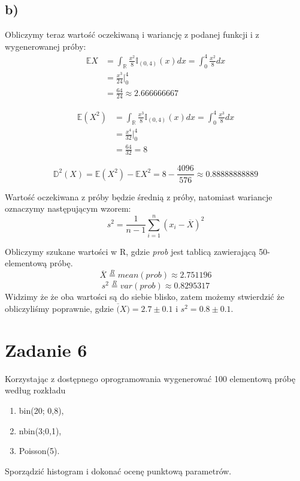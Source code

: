 \documentclass{article}
\begin{document}
\subsection{b)}
Obliczymy teraz wartość oczekiwaną i wariancję z podanej funkcji i z wygenerowanej próby:
\begin{align*}
\mathbb{E}X & = \int_\mathbb{R} \frac{x^2}{8}\mathbb{I}_{(0,4)}(x) dx = \int_0^4 \frac{x^2}{8} dx \\
& = \frac{x^3}{24} \Big\vert_0^4 \\
& = \frac{64}{24} \approx 2.666666667
\end{align*}

\begin{align*}
\mathbb{E}(X^2) & = \int_\mathbb{R} \frac{x^3}{8}\mathbb{I}_{(0,4)}(x) dx = \int_0^4 \frac{x^3}{8} dx \\
& = \frac{x^4}{32} \Big\vert_0^4 \\
& = \frac{64}{32} = 8
\end{align*}

\[ \mathbb{D}^2(X) = \mathbb{E}(X^2) - \mathbb{E}X^2 = 8 - \frac{4096}{576} \approx 0.88888888889 \]

Wartość oczekiwana z próby będzie średnią z próby, natomiast wariancje oznaczymy następującym wzorem:
\[ s^2 = \frac{1}{n-1}\sum_{i=1}^n (x_i - \overline{X})^2 \]

Obliczymy szukane wartości w R, gdzie \textit{prob} jest tablicą zawierającą 50-elementową próbę.
\[ \overline{X} \overset{R}{=} mean(prob) \approx 2.751196 \]
\[ s^2 \overset{R}{=} var(prob) \approx 0.8295317 \]
Widzimy że że oba wartości są do siebie blisko, zatem możemy stwierdzić że obliczyliśmy poprawnie, gdzie $\overline(X) = 2.7 \pm 0.1$ i $s^2 = 0.8 \pm 0.1$.

\newpage
\section{Zadanie 6}
Korzystając z dostępnego oprogramowania wygenerować 100 elementową próbę według rozkładu
\begin{enumerate}[label = \alph*)]
\item bin(20; 0,8),
\item nbin(3;0,1),
\item Poisson(5).
\end{enumerate}
Sporządzić histogram i dokonać ocenę punktową parametrów. \\ \par
\end{document}
